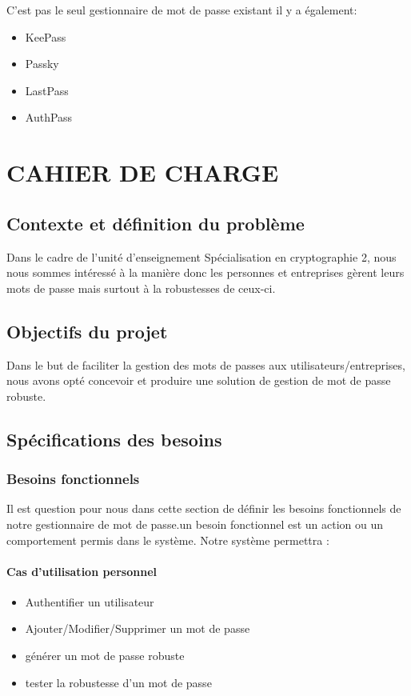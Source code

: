 \documentclass[11pt,a4paper]{report}
\begin{document}
C'est pas le seul gestionnaire de mot de passe existant il y a également:

\begin{itemize}
 \item KeePass
 \item Passky
 \item LastPass
 \item AuthPass
 \end{itemize}

\chapter{CAHIER DE CHARGE}
\section{Contexte et définition du problème}
 Dans le cadre de l'unité d'enseignement Spécialisation en cryptographie 2, nous nous sommes intéressé à la manière donc les personnes et entreprises gèrent leurs mots de passe mais surtout à la robustesses de ceux-ci.
 \section{Objectifs du projet}
 Dans le but de faciliter la gestion des mots de passes aux utilisateurs/entreprises, nous avons opté concevoir et produire une solution de gestion de mot de passe robuste.
 \section{Spécifications des besoins}
 \subsection{Besoins fonctionnels}
 Il est question pour nous dans cette section de définir les besoins fonctionnels de notre gestionnaire de mot de passe.un besoin fonctionnel est un action ou un comportement permis dans le système. Notre système permettra :
 \subsubsection{Cas d'utilisation personnel}
 \begin{itemize}
 \item Authentifier un utilisateur
 \item Ajouter/Modifier/Supprimer un mot de passe
 \item générer un mot de passe robuste
 \item tester la robustesse d'un mot de passe
 \end{itemize}
 
\end{document}
